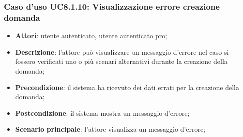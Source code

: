 	\subsubsection{Caso d'uso UC8.1.10: Visualizzazione errore creazione domanda}
	\begin{itemize}
		\item
			\textbf{Attori}: utente autenticato, utente autenticato pro;
		\item
			\textbf{Descrizione}: l'attore può visualizzare un messaggio d'errore nel caso si fossero verificati uno o più scenari alternativi durante la creazione della domanda;
		\item		
			\textbf{Precondizione}: il sistema ha ricevuto dei dati errati per la creazione della domanda;
		\item
			\textbf{Postcondizione}: il sistema mostra un messaggio d'errore;
		\item
			\textbf{Scenario principale}: l'attore visualizza un messaggio d'errore;	
	\end{itemize}	



